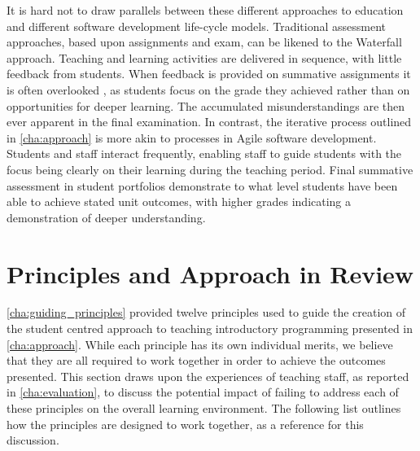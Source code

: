 It is hard not to draw parallels between these different approaches to education and different software development life-cycle models. Traditional assessment approaches, based upon assignments and exam, can be likened to the Waterfall approach. Teaching and learning activities are delivered in sequence, with little feedback from students. When feedback is provided on summative assignments it is often overlooked \cite{Black:1998}, as students focus on the grade they achieved rather than on opportunities for deeper learning. The accumulated misunderstandings are then ever apparent in the final examination. In contrast, the iterative process outlined in \cref{cha:approach} is more akin to processes in Agile software development. Students and staff interact frequently, enabling staff to guide students with the focus being clearly on their learning during the teaching period. Final summative assessment in student portfolios demonstrate to what level students have been able to achieve stated unit outcomes, with higher grades indicating a demonstration of deeper understanding.


\section{Principles and Approach in Review} %
\label{sec:approach_and_principles_in_review}

\cref{cha:guiding_principles} provided twelve principles used to guide the creation of the student centred approach to teaching introductory programming presented in \cref{cha:approach}. While each principle has its own individual merits, we believe that they are all required to work together in order to achieve the outcomes presented. This section draws upon the experiences of teaching staff, as reported in \cref{cha:evaluation}, to discuss the potential impact of failing to address each of these principles on the overall learning environment. The following list outlines how the principles are designed to work together, as a reference for this discussion.

